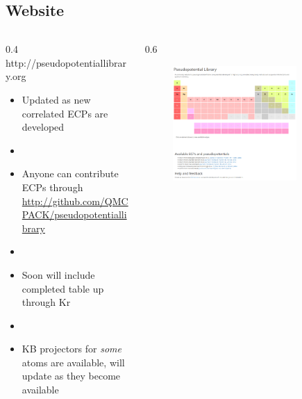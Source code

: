 \subsection{Website}
\begin{frame}
    \begin{columns}
	\begin{column}
	    {0.4\textwidth}
	    {\color{darkblue} http://pseudopotentiallibrary.org}
	    \scriptsize
	    \begin{itemize}
		\item[] Updated as new correlated ECPs are developed
		\item[]
		\item[] Anyone can contribute ECPs through \url{http://github.com/QMCPACK/pseudopotentiallibrary}
		\item[]
		\item[] Soon will include completed table up through Kr
		\item[]
        \item[] KB projectors for {\it some} atoms are available, will update as they become available
	    \end{itemize}
	\end{column}
	\begin{column}
	    {0.6\textwidth}
	    \begin{figure}[h]
		\centering
		\includegraphics[width=0.8\textwidth]{figures/pseudopotentiallibrary}
	    \end{figure}
	\end{column}
    \end{columns}
\end{frame}

